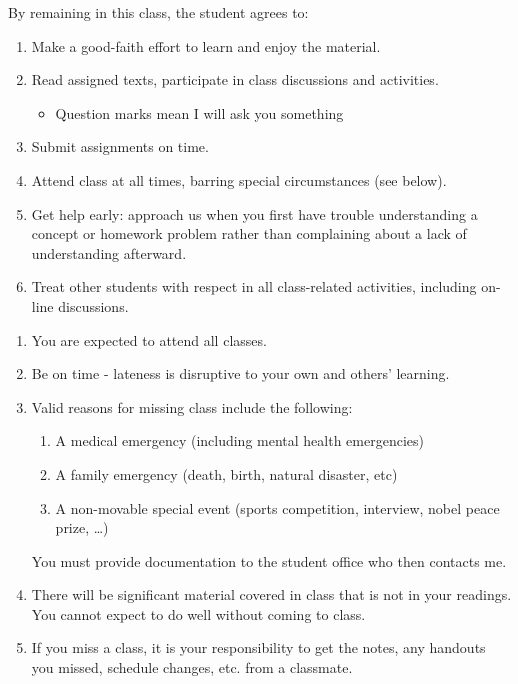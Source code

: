 \documentclass[headrule,footrule]{foils}
\begin{document}
By remaining in this class, the student agrees to:
\begin{enumerate}
\item  Make a good-faith effort to learn and enjoy the material.
\item  Read assigned texts, participate in class discussions and
  activities.
  \begin{itemize}
  \item Question marks mean I will ask you something\task
  \end{itemize}
\item Submit assignments on time.
\item Attend class at all times, barring special circumstances (see below).
\item Get help early: approach us when you first have trouble understanding a concept or homework problem rather than complaining about a lack of understanding afterward.
\item Treat other students with respect in all class-related activities, including on-line discussions.
\end{enumerate}
\begin{enumerate}
\item You are expected to attend all classes.
\item Be on time - lateness is disruptive to your own and others' learning.
\item Valid reasons for missing class include the following:
\begin{enumerate}
\item A medical emergency (including mental health emergencies)
\item A family emergency (death, birth, natural disaster, etc)
\item A non-movable special event (sports competition, interview,
  nobel peace prize, \ldots{})
\end{enumerate}
You must provide documentation to the student office who then contacts
me.
\item There will be significant material covered in class that is not in your readings.  You cannot expect to do well without coming to class.
\item If you miss a class, it is your responsibility to get the notes, any handouts you missed, schedule changes, etc. from a classmate.
\end{enumerate}
\end{document}
